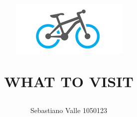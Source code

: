 \documentclass[
article,
10pt, %
oneside, %
BCOR5mm, %
]{scrartcl}
\begin{document}
\begin{center}
\title{
  \begin{figure}[h!]
  \centering
  \includegraphics[width=.3\columnwidth]{images/project_logo.png}
  \end{figure}
  WHAT TO VISIT
}
\author{
Sebastiano Valle 1050123}
\end{center} %









\maketitle %

\setcounter{page}{1} %


\raggedright{}
\newpage{}
\tableofcontents %



\listoffigures %

\listoftables %



\newpage %
\end{document}
